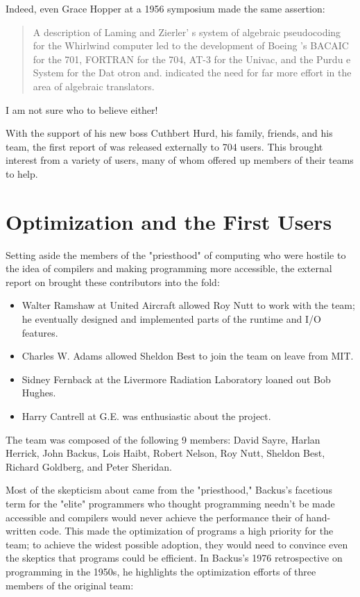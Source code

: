 Indeed, even Grace Hopper at a 1956 symposium made the same assertion:

\begin{quotation}
    A description of Laming and Zierler' s system of algebraic pseudocoding for 
the Whirlwind computer led to the development of Boeing 's BACAIC for the 701, 
FORTRAN for the 704, AT-3 for the Univac, and the Purdu e System for the Dat 
otron and. indicated the need for far more effort in the area of algebraic 
translators.
\cite{Knuth_TrabbPardo_1976_Early_Development}
\end{quotation}

I am not sure who to believe either!

With the support of his new boss Cuthbert Hurd, his family, friends, and his team,
the first report of \FTN{} was released externally to 704 users.
This brought interest from a variety of users, many of whom offered up members
of their teams to help.

\section{\FTN{} Optimization and the First Users}

Setting aside the members of the "priesthood" of computing who were hostile to the
idea of compilers and making programming more accessible, the external report on \FTN{}
brought these contributors into the fold:
\begin{itemize}
    \item Walter Ramshaw at United Aircraft allowed Roy Nutt to work with the team;
            he eventually designed and implemented parts of the runtime and I/O features.
    \item Charles W. Adams allowed Sheldon Best to join the team on leave from MIT.
    \item Sidney Fernback at the Livermore Radiation Laboratory loaned out Bob Hughes.
    \item Harry Cantrell at G.E. was enthusiastic about the project.
\end{itemize}

The team was composed of the following 9 members: 
David Sayre, Harlan Herrick, John Backus, 
Lois Haibt, Robert Nelson, Roy Nutt, 
Sheldon Best, Richard Goldberg, and Peter Sheridan.

Most of the skepticism about \FTN{} came from the "priesthood," Backus's facetious term
for the "elite" programmers who thought programming needn't be made accessible 
and compilers would never achieve the performance their of hand-written code.
This made the optimization of \FTN{} programs a high priority for the team; to achieve
the widest possible adoption, they would need to convince even the skeptics that
\FTN{} programs could be efficient.
In Backus's 1976 retrospective on programming in the 1950s\cite{Backus_1980_Programming_in_America_in_1950s},
he highlights the optimization efforts of three members of the original team:

